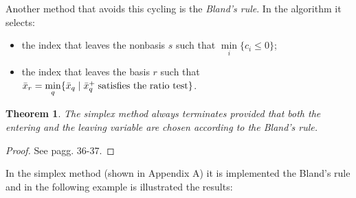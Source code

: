 \documentclass[a4paper,10 pt,titlepage,twoside]{book}
\theoremstyle{plain}
\newtheorem*{theorem*}{Theorem}
\theoremstyle{definition}
\theoremstyle{remark}
\begin{document}
Another method that avoids this cycling is the \textit{Bland's rule}. In the algorithm it selects:
\begin{itemize}
	\item the index that leaves the nonbasis $s$ such that $\min\limits_{i}\{c_{i}\leq0\}$;
\item the index that leaves the basis $r$ such that $\bar{x}_{r} = \min\limits_{q}\{\bar{x}_{q}\;|\;\bar{x}_{q}^{+} \text{\;satisfies the ratio test} \}$. \end{itemize} 
\begin{theorem*}
	The simplex method always terminates provided that both the entering and the leaving variable are chosen according to the Bland's rule.
\end{theorem*}
\begin{proof}
See \cite{LP} pagg. 36-37.	
\end{proof}
In the simplex method (shown in Appendix A) it is implemented the Bland's rule and in the following example is illustrated the results:
\end{document}

